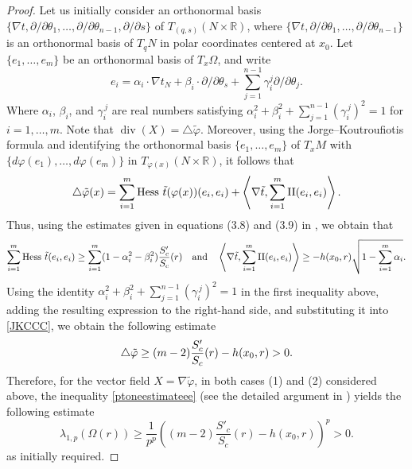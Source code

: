 \documentclass{article}
\begin{document}
\begin{proof}
Let us initially consider an orthonormal basis 
$\{\nabla t, \partial/\partial \theta_1, \ldots, \partial/\partial \theta_{n-1}, \partial/\partial s\}$ 
of $T_{(q,s)}(N \times \mathbb{R})$, where 
$\{\nabla t, \partial/\partial \theta_1, \ldots, \partial/\partial \theta_{n-1}\}$ 
is an orthonormal basis of $T_q N$ in polar coordinates centered at $x_0$. 
Let $\{e_1, \ldots, e_m\}$ be an orthonormal basis of $T_x\Omega$, and write
\begin{equation}
    e_i = \alpha_i \cdot \nabla t_N + \beta_i \cdot \partial/\partial \theta_s + \sum_{j=1}^{n-1}\gamma_i^{j}\partial/\partial \theta_j.
\end{equation}
Where $\alpha_i$, $\beta_i$, and $\gamma_i^{\,j}$ are real numbers satisfying $\alpha_i^{2} + \beta_i^{2} + \sum_{j=1}^{n-1} (\gamma_i^{\,j})^{2} = 1$ for $i = 1,\ldots,m$. Note that $\operatorname{div}(X) = \triangle \widetilde{\varphi}$. Moreover, using the Jorge--Koutroufiotis formula \cite{JorgeKoutrofiotis1981} and identifying the orthonormal basis $\{e_1,\ldots,e_m\}$ of $T_x M$ with $\{d\varphi(e_1),\ldots,d\varphi(e_m)\}$ in $T_{\varphi(x)}(N \times \mathbb{R})$, it follows that
\begin{equation}\label{JKCCC}
    \triangle\Tilde{\varphi}(x) = \sum_{i=1}^m \operatorname{Hess} \, \Tilde{t}(\varphi(x))(e_i,e_i)
   + \left\langle \nabla \Tilde{t} , \sum_{i=1}^m \mathrm{I}\mathrm{I}(e_i,e_i)  \right\rangle .
\end{equation}
Thus, using the estimates given in equations (3.8) and (3.9) in \cite{Bessa-Silvana}, we obtain that
\begin{equation*}
    \sum_{i=1}^{m}\operatorname{Hess} \, \Tilde{t}(e_i,e_i) \geq \sum_{i=1}^{m}(1 -\alpha_i^2 -\beta_i^2)\frac{S'_c}{S_c}(r) \quad \text{and} \quad  \left\langle \nabla \Tilde{t} , \sum_{i=1}^m \mathrm{I}\mathrm{I}(e_i,e_i)  \right\rangle \geq -h(x_0,r)\sqrt{1 - \sum_{i=1}^{m}\alpha_i}.
\end{equation*}
Using the identity $\alpha_i^{2} + \beta_i^{2} + \sum_{j=1}^{n-1} (\gamma_i^{\,j})^{2} = 1$ in the first inequality above, adding the resulting expression to the right-hand side, and substituting it into \eqref{JKCCC}, we obtain the following estimate
\begin{equation*}
    \triangle\Tilde{\varphi} \geq (m-2)\dfrac{S'_c}{S_c}(r) - h(x_0,r)>0.
\end{equation*}
Therefore, for the vector field $X = \nabla \widetilde{\varphi}$, in both cases (1) and (2) considered above, the inequality \eqref{ptoneestimateee} (see the detailed argument in \cite[p. 8]{Bessa-Silvana}) yields the following estimate
\begin{equation*}
 \lambda_{1,p}(\Omega(r)) \geq    \frac{1}{p^{p}}
\left((m-2)\frac{S'_c}{S_c}(r)-h(x_0,r)\right)^{p} > 0.
\end{equation*}
as initially required.
\end{proof}
\end{document}
